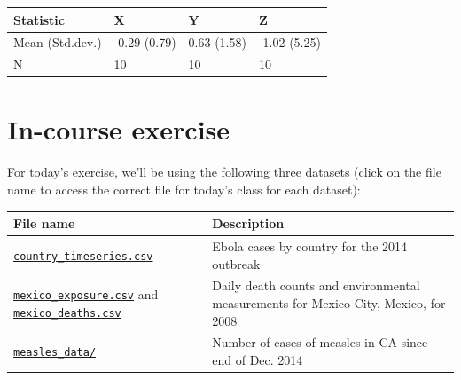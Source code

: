 \documentclass[]{book}
\theoremstyle{definition}
\theoremstyle{definition}
\theoremstyle{definition}
\theoremstyle{remark}
\begin{document}
\begin{tabular}{l|l|l|l}
\hline
Statistic & X & Y & Z\\
\hline
Mean (Std.dev.) & -0.29 (0.79) & 0.63 (1.58) & -1.02 (5.25)\\
\hline
N & 10 & 10 & 10\\
\hline
\end{tabular}

\section{In-course exercise}\label{in-course-exercise-5}

For today's exercise, we'll be using the following three datasets (click
on the file name to access the correct file for today's class for each
dataset):

\begin{longtable}[]{@{}ll@{}}
\toprule
\begin{minipage}[b]{0.27\columnwidth}\raggedright\strut
File name\strut
\end{minipage} & \begin{minipage}[b]{0.63\columnwidth}\raggedright\strut
Description\strut
\end{minipage}\tabularnewline
\midrule
\endhead
\begin{minipage}[t]{0.27\columnwidth}\raggedright\strut
\href{https://github.com/geanders/RProgrammingForResearch/raw/master/data/country_timeseries.csv}{\texttt{country\_timeseries.csv}}\strut
\end{minipage} & \begin{minipage}[t]{0.63\columnwidth}\raggedright\strut
Ebola cases by country for the 2014 outbreak\strut
\end{minipage}\tabularnewline
\begin{minipage}[t]{0.27\columnwidth}\raggedright\strut
\href{https://github.com/geanders/RProgrammingForResearch/raw/master/data/mexico_exposure.csv}{\texttt{mexico\_exposure.csv}}
and
\href{https://github.com/geanders/RProgrammingForResearch/raw/master/data/mexico_deaths.csv}{\texttt{mexico\_deaths.csv}}\strut
\end{minipage} & \begin{minipage}[t]{0.63\columnwidth}\raggedright\strut
Daily death counts and environmental measurements for Mexico City,
Mexico, for 2008\strut
\end{minipage}\tabularnewline
\begin{minipage}[t]{0.27\columnwidth}\raggedright\strut
\href{https://github.com/geanders/RProgrammingForResearch/tree/master/data/measles_data}{\texttt{measles\_data/}}\strut
\end{minipage} & \begin{minipage}[t]{0.63\columnwidth}\raggedright\strut
Number of cases of measles in CA since end of Dec. 2014\strut
\end{minipage}\tabularnewline
\bottomrule
\end{longtable}
\end{document}
